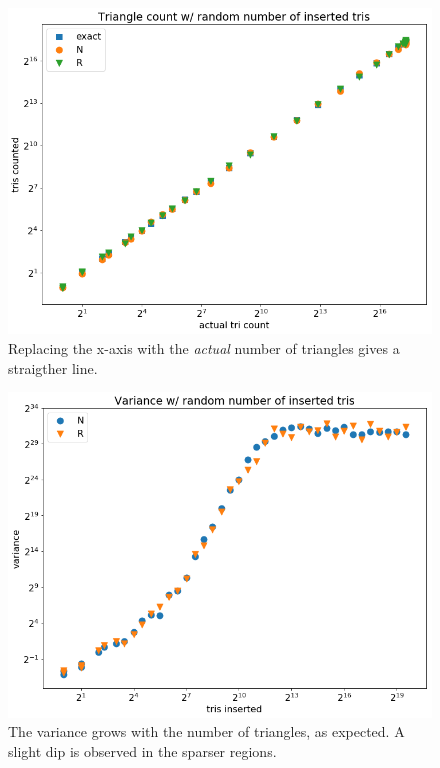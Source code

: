 \documentclass{beamer}
\begin{document}
\begin{frame}
    \begin{figure}
        \centering
        \includegraphics[width=0.7\linewidth]{figs/number-actual.png}
        \caption{Replacing the x-axis with the \textit{actual} number of triangles gives a straigther line.}
        \label{fig:number-count}
    \end{figure}
\end{frame}


\begin{frame}
    \begin{figure}
        \centering
        \includegraphics[width=0.7\linewidth]{figs/number-variance.png}
        \caption{The variance grows with the number of triangles, as expected. A slight dip is observed in the sparser regions.}
        \label{fig:number-variance}
    \end{figure}
\end{frame}
\end{document}

